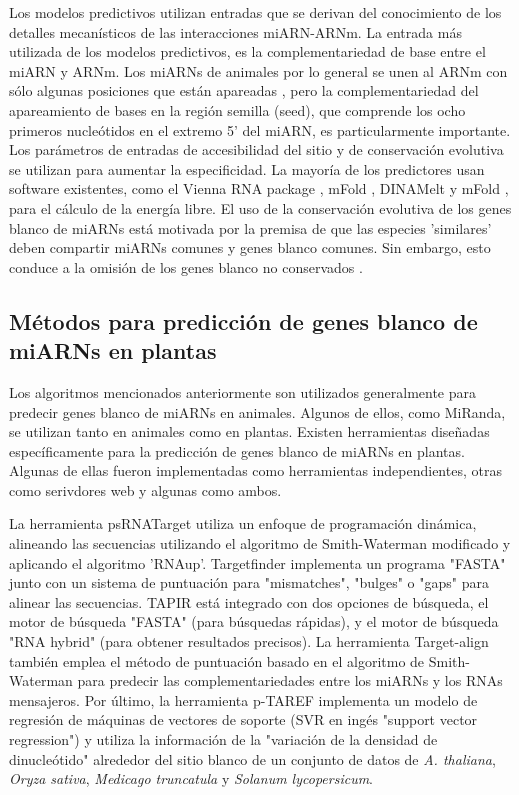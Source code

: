 Los modelos predictivos utilizan entradas que se derivan del conocimiento de los detalles mecanísticos de las interacciones miARN-ARNm.
La entrada  más utilizada de los modelos predictivos, es la complementariedad de base entre el miARN y ARNm.
Los miARNs de animales por lo general se unen al ARNm con sólo algunas posiciones que están apareadas \citep{pmid15345038}, pero la complementariedad del apareamiento de bases en la región semilla (seed), que comprende los ocho primeros nucleótidos en el extremo 5' del miARN, es particularmente importante.
Los parámetros de entradas de accesibilidad del sitio y de conservación evolutiva se utilizan para aumentar la especificidad.
La mayoría de los predictores usan software existentes, como el Vienna RNA package \citep{pmid22115189}, mFold \citep{pmid12824337}, DINAMelt \citep{pmid15980540} y mFold \citep{pmid15215366}, para el cálculo de la energía libre.
El uso de la conservación evolutiva de los genes blanco de miARNs está motivada por la premisa de que las especies 'similares' deben compartir miARNs comunes y genes blanco comunes.
Sin embargo, esto conduce a la omisión de los genes blanco no conservados \citep{pmid17254305, pmid21674004}.


\subsection{Métodos para predicción de genes blanco de miARNs en plantas}
Los algoritmos mencionados anteriormente son utilizados generalmente para predecir genes blanco de miARNs en animales.
Algunos de ellos, como MiRanda, se utilizan tanto en animales como en plantas.
Existen herramientas diseñadas específicamente para la predicción de genes blanco de miARNs en plantas.
Algunas de ellas fueron implementadas como herramientas independientes, otras como serivdores web y algunas como ambos.

La herramienta psRNATarget \citep{pmid21622958} utiliza un enfoque de programación dinámica, alineando las secuencias utilizando el algoritmo de Smith-Waterman modificado y aplicando el algoritmo 'RNAup'.
Targetfinder \citep{pmid15598838} implementa un programa "FASTA" junto con un sistema de puntuación para "mismatches", "bulges" o "gaps" para alinear las secuencias.
TAPIR \citep{pmid20430753} está integrado con dos opciones de búsqueda, el motor de búsqueda "FASTA" (para búsquedas rápidas), y el motor de búsqueda "RNA hybrid" (para obtener resultados precisos).
La herramienta Target-align \citep{pmid20934992} también emplea el método de puntuación basado en el algoritmo de Smith-Waterman para predecir las complementariedades entre los miARNs y los RNAs mensajeros.
Por último, la herramienta p-TAREF \citep{pmid22206472} implementa un modelo de regresión de máquinas de vectores de soporte (SVR en ingés "support vector regression") y utiliza la información de la "variación de la densidad de dinucleótido" alrededor del sitio blanco de un conjunto de datos de \textit{A. thaliana}, \textit{Oryza sativa}, \textit{Medicago truncatula} y \textit{Solanum lycopersicum}.

